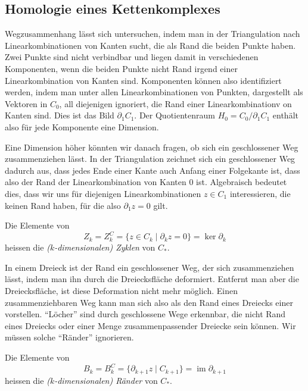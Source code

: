 %
%
%
\subsection{Homologie eines Kettenkomplexes
\label{buch:subsection:homologie-eines-kettenkomplexes}}
Wegzusammenhang lässt sich untersuchen, indem man in der Triangulation
nach Linearkombinationen von Kanten sucht, die als Rand die beiden Punkte
haben.
Zwei Punkte sind nicht verbindbar und liegen damit in verschiedenen
Komponenten, wenn die beiden Punkte nicht Rand irgend einer
Linearkombination von Kanten sind.
Komponenten können also identifiziert werden, indem man unter allen
Linearkombinationen von Punkten, dargestellt als Vektoren in $C_0$, all diejenigen ignoriert,
die Rand einer Linearkombinationv on Kanten sind.
Dies ist das Bild $\partial_1C_1$.
Der Quotientenraum $H_0=C_0/\partial_1C_1$ enthält also für jede Komponente
eine Dimension.

Eine Dimension höher könnten wir danach fragen, ob sich ein geschlossener
Weg zusammenziehen lässt.
In der Triangulation zeichnet sich ein geschlossener Weg dadurch aus,
dass jedes Ende einer Kante auch Anfang einer Folgekante ist, dass also
der Rand der Linearkombination von Kanten 0 ist.
Algebraisch bedeutet dies, dass wir uns für diejenigen Linearkombinationen
$z\in C_1$ interessieren, die keinen Rand haben, für die also $\partial_1z=0$
gilt.

\begin{definition}
Die Elemente von
\[
Z_k
=
Z_k^C
=
\{z\in C_k \mid \partial_k z = 0\}
=
\ker \partial_k
\]
heissen die {\em ($k$-dimensionalen) Zyklen} von $C_*$.
\end{definition}

In einem Dreieck ist der Rand ein geschlossener Weg, der sich zusammenziehen
lässt, indem man ihn durch die Dreiecksfläche deformiert.
Entfernt man aber die Dreiecksfläche, ist diese Deformation nicht mehr
möglich.
Einen zusammenziehbaren Weg kann man sich also als den Rand eines Dreiecks
einer vorstellen.
``Löcher'' sind durch geschlossene Wege erkennbar, die nicht Rand eines
Dreiecks oder einer Menge zusammenpassender Dreiecke sein können.
Wir müssen solche ``Ränder'' ignorieren.

\begin{definition}
Die Elemente von
\[
B_k
=
B_k^C
=
\{\partial_{k+1}z \mid C_{k+1}\}
=
\operatorname{im} \partial_{k+1}
\]
heissen die {\em ($k$-dimensionalen) Ränder} von $C_*$.
\end{definition}


